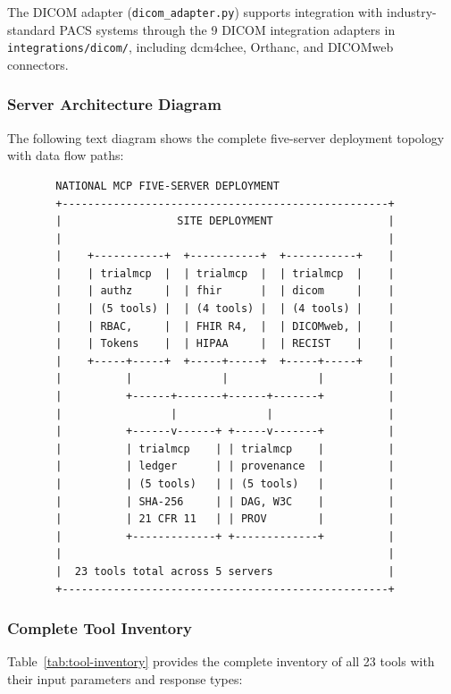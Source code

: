 The DICOM adapter (\texttt{dicom\_adapter.py}) supports integration with industry-standard PACS systems through the 9 DICOM integration adapters in \texttt{integrations/dicom/}, including dcm4chee, Orthanc, and DICOMweb connectors.

\subsubsection{Server Architecture Diagram}

The following text diagram shows the complete five-server deployment topology with data flow paths:

\begin{figure}[H]
\begin{verbatim}
  NATIONAL MCP FIVE-SERVER DEPLOYMENT
  +---------------------------------------------------+
  |                  SITE DEPLOYMENT                  |
  |                                                   |
  |    +-----------+  +-----------+  +-----------+    |
  |    | trialmcp  |  | trialmcp  |  | trialmcp  |    |
  |    | authz     |  | fhir      |  | dicom     |    |
  |    | (5 tools) |  | (4 tools) |  | (4 tools) |    |
  |    | RBAC,     |  | FHIR R4,  |  | DICOMweb, |    |
  |    | Tokens    |  | HIPAA     |  | RECIST    |    |
  |    +-----+-----+  +-----+-----+  +-----+-----+    |
  |          |              |              |          |
  |          +------+-------+------+-------+          |
  |                 |              |                  |
  |          +------v------+ +-----v-------+          |
  |          | trialmcp    | | trialmcp    |          |
  |          | ledger      | | provenance  |          |
  |          | (5 tools)   | | (5 tools)   |          |
  |          | SHA-256     | | DAG, W3C    |          |
  |          | 21 CFR 11   | | PROV        |          |
  |          +-------------+ +-------------+          |
  |                                                   |
  |  23 tools total across 5 servers                  |
  +---------------------------------------------------+
\end{verbatim}
\end{figure}

\subsubsection{Complete Tool Inventory}

Table~\ref{tab:tool-inventory} provides the complete inventory of all 23 tools with their input parameters and response types:

